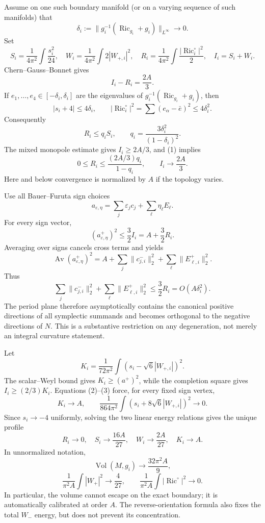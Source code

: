 Assume on one such boundary manifold (or on a varying sequence of such manifolds) that
\[
 \delta_i:=\|g_i^{-1}(\operatorname{Ric}_{g_i}+g_i)\|_{L^\infty}\longrightarrow0.
\]
Set
\[
 S_i=\frac1{4\pi^2}\int\frac{s_i^2}{24},\quad
 W_i=\frac1{4\pi^2}\int2|W_{+,i}|^2,\quad
 R_i=\frac1{4\pi^2}\int\frac{|\operatorname{Ric}_i^\circ|^2}{2},
\quad I_i=S_i+W_i.
\]
Chern--Gauss--Bonnet gives
\[
 I_i-R_i=\frac{2A}{3}.                                      \tag{1}
\]
If \(e_1,\dots,e_4\in[-\delta_i,\delta_i]\) are the eigenvalues of
\(g_i^{-1}(\operatorname{Ric}_{g_i}+g_i)\), then
\[
 |s_i+4|\le4\delta_i,
 \qquad |\operatorname{Ric}_i^\circ|^2
 =\sum(e_\alpha-\bar e)^2\le4\delta_i^2.
\]
Consequently
\[
 R_i\le q_iS_i,\qquad q_i=\frac{3\delta_i^2}{(1-\delta_i)^2}.
\]
The mixed monopole estimate gives \(I_i\ge2A/3\), and (1) implies
\[
 0\le R_i\le \frac{(2A/3)q_i}{1-q_i},\qquad
 I_i\to\frac{2A}{3}.                                      \tag{2}
\]
Here and below convergence is normalized by \(A\) if the topology varies.

Use all Bauer--Furuta sign choices
\[
 a_{\varepsilon,\eta}=\sum_j\varepsilon_jc_j+\sum_\ell\eta_\ell E_\ell.
\]
For every sign vector,
\[
 (a_{\varepsilon,\eta}^+)^2\le\frac32I_i=A+\frac32R_i.
\]
Averaging over signs cancels cross terms and yields
\[
 \operatorname{Av}(a_{\varepsilon,\eta}^+)^2
 =A+\sum_j\|c_{j,i}^-\|_2^2+\sum_\ell\|E_{\ell,i}^+\|_2^2.
\]
Thus
\[
 \sum_j\|c_{j,i}^-\|_2^2+\sum_\ell\|E_{\ell,i}^+\|_2^2
 \le\frac32R_i=O(A\delta_i^2).                            \tag{3}
\]
The period plane therefore asymptotically contains the canonical positive directions of all symplectic summands and becomes orthogonal to the negative directions of \(N\).  This is a substantive restriction on any degeneration, not merely an integral curvature statement.

Let
\[
 K_i=\frac1{72\pi^2}\int(s_i-\sqrt6|W_{+,i}|)^2.
\]
The scalar--Weyl bound gives \(K_i\ge(a^+)^2\), while the completion square gives
\(I_i\ge(2/3)K_i\).  Equations (2)--(3) force, for every fixed sign vertex,
\[
 K_i\to A,
 \qquad \frac1{864\pi^2}\int(s_i+8\sqrt6|W_{+,i}|)^2\to0. \tag{4}
\]
Since \(s_i\to-4\) uniformly, solving the two linear energy relations gives the unique profile
\[
 \boxed{R_i\to0,\quad S_i\to\frac{16A}{27},\quad
 W_i\to\frac{2A}{27},\quad K_i\to A}.                    \tag{5}
\]
In unnormalized notation,
\[
 \boxed{\operatorname{Vol}(M,g_i)\to\frac{32\pi^2A}{9}}, \tag{6}
\]
\[
 \boxed{\frac1{\pi^2A}\int|W_+|^2\to\frac4{27},\qquad
 \frac1{\pi^2A}\int|\operatorname{Ric}^\circ|^2\to0}.   \tag{7}
\]
In particular, the volume cannot escape on the exact boundary; it is automatically calibrated at order \(A\).  The reverse-orientation formula also fixes the total \(W_-\) energy, but does not prevent its concentration.

